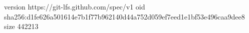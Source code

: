 version https://git-lfs.github.com/spec/v1
oid sha256:d1fe626a501614e7b1f77b962140d44a752d059ef7eed1e1bf53e496caa9dee8
size 442213
